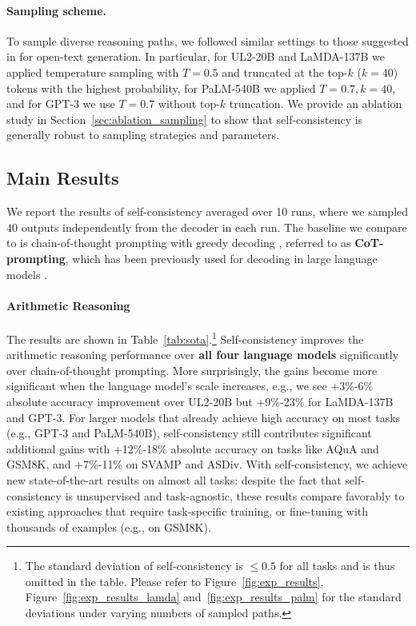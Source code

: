 \documentclass{article} %
\begin{document}
\vspace{-0.1in}
\paragraph{Sampling scheme.}
To sample diverse reasoning paths, we followed similar settings to those suggested in \citet{Radford2019LanguageMA,nucleus_sampling} for open-text generation.
In particular, for UL2-20B and LaMDA-137B
we applied temperature sampling with $T=0.5$ and truncated at the top-$k$ ($k=40$) tokens with the highest probability, for PaLM-540B  we applied $T=0.7, k=40$, and for GPT-3 we use $T=0.7$ without top-$k$ truncation.  
We provide an ablation study in Section~\ref{sec:ablation_sampling} to show that self-consistency is generally robust to sampling strategies and parameters.

\subsection{Main Results}
We report the results of self-consistency averaged over 10 runs, where we sampled 40 outputs independently from the decoder in each run. The baseline we compare to is chain-of-thought prompting with greedy decoding \citep{wei2022chain}, referred to as \textbf{CoT-prompting}, which has been previously used for decoding in large language models \citep{palm}.

\vspace{-0.1in}
\paragraph{Arithmetic Reasoning}
The results are shown in Table~\ref{tab:sota}.\footnote{The standard deviation of  self-consistency is $\leq0.5$ for all tasks and is thus omitted in the table. 
Please refer to Figure~\ref{fig:exp_results}, Figure~\ref{fig:exp_results_lamda} and~\ref{fig:exp_results_palm} for the standard deviations under varying numbers of sampled paths.}
Self-consistency improves the arithmetic reasoning performance over \textbf{all four language models} significantly over chain-of-thought prompting.
More surprisingly, the gains become more significant when the language model's scale increases, e.g., we see +3\%-6\% absolute accuracy improvement over UL2-20B but +9\%-23\% for LaMDA-137B and GPT-3.
For larger models that already achieve high accuracy on most tasks (e.g., GPT-3 and PaLM-540B), self-consistency still contributes significant additional gains with +12\%-18\% absolute accuracy on tasks like AQuA and GSM8K, and +7\%-11\% on SVAMP and ASDiv. 
With self-consistency, we achieve new state-of-the-art results on almost all tasks:
despite the fact that self-consistency is unsupervised and task-agnostic, these results compare favorably to existing approaches that require task-specific training, or fine-tuning with thousands of examples (e.g., on GSM8K).
\end{document}
